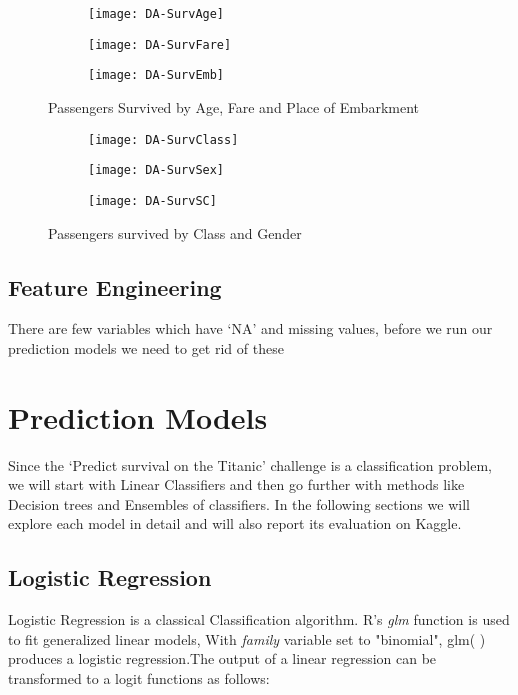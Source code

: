 \documentclass[a4paper,10pt]{report}\usepackage[]{graphicx}\usepackage[]{color}
\begin{document}
\begin{figure}[h]
\centering
  \begin{subfigure}[b]{0.3\textwidth}
    \texttt{[image: DA-SurvAge]}
    \end{subfigure}
  \begin{subfigure}[b]{0.3\textwidth}
    \texttt{[image: DA-SurvFare]}
    \end{subfigure}
    \begin{subfigure}[b]{0.3\textwidth}
    \texttt{[image: DA-SurvEmb]}
  \end{subfigure}
  \caption{Passengers Survived by Age, Fare and Place of Embarkment}\label{Surv}
\end{figure}






\begin{figure}[h]
\centering
  \begin{subfigure}[b]{0.3\textwidth}
    \texttt{[image: DA-SurvClass]}
    \end{subfigure}
  \begin{subfigure}[b]{0.3\textwidth}
    \texttt{[image: DA-SurvSex]}
    \end{subfigure}
  \begin{subfigure}[b]{0.3\textwidth}
    \texttt{[image: DA-SurvSC]}
  \end{subfigure}
  \caption{Passengers survived by Class and Gender}\label{SurvCSE}
\end{figure}

\section{Feature Engineering}
There are few variables which have `NA' and missing values, before we run our prediction models we need to get rid of these
\chapter{Prediction Models}
Since the `Predict survival on the Titanic' challenge is a classification problem, we will start with Linear Classifiers and then go further with methods like Decision trees and Ensembles of classifiers. In the following sections we will explore each model in detail and will also report its evaluation on Kaggle.

\section{Logistic Regression}
Logistic Regression is a classical Classification algorithm. R's \emph{glm} function is used to fit generalized linear models, With \emph{family} variable set to "binomial", glm( ) produces a logistic regression.The output of a linear regression can be transformed to a logit functions as follows:
\end{document}
